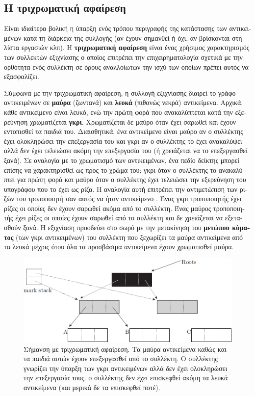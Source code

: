 \begin{greek}
\section{Η τριχρωματική αφαίρεση}
Είναι ιδιαίτερα βολική η ύπαρξη ενός τρόπου περιγραφής της
κατάστασης των αντικειμένων κατά τη διάρκεια της συλλογής
(αν έχουν σημανθεί ή όχι, αν βρίσκονται στη λίστα εργασιών
κλπ). Η \textbf{τριχρωματική αφαίρεση}  είναι ένας χρήσιμος χαρακτηρισμός
των συλλεκτών εξιχνίασης ο οποίος επιτρέπει την 
επιχειρηματολογία σχετικά με την ορθότητα ενός συλλέκτη
σε όρους αναλλοίωτων την ισχύ των οποίων πρέπει αυτός να
εξασφαλίζει. 

Σύμφωνα με την τριχρωματική αφαίρεση, η συλλογή εξιχνίασης
διαιρεί το γράφο αντικειμένων σε \textbf{μαύρα} (ζωντανά) 
και \textbf{λευκά} (πιθανώς νεκρά) αντικείμενα. Αρχικά, κάθε
αντικείμενο είναι λευκό, ενώ την πρώτη φορά που ανακαλύπτεται
κατά την εξερεύνηση χρωματίζεται \textbf{γκρι}. Χρωματίζεται
δε μαύρο όταν έχει σαρωθεί και έχουν εντοπισθεί τα παιδιά του.
Διαισθητικά, ένα αντικείμενο είναι μαύρο αν ο συλλέκτης έχει
ολοκληρώσει την επεξεργασία του και γκρι αν ο συλλέκτης το
έχει ανακαλύψει αλλά δεν έχει τελειώσει ακόμη την επεξεργασία
του (ή χρειάζεται να το επεξεργασθεί ξανά). Σε αναλογία με
το χρωματισμό των αντικειμένων, ένα πεδίο δείκτης μπορεί 
επίσης να χαρακτηρισθεί ως προς το χρώμα του: γκρι όταν ο
συλλέκτης το ανακαλύπτει για πρώτη φορά και μαύρο όταν ο
συλλέκτης έχει τελειώσει την εξερεύνηση του υπογράφου που
το έχει ως ρίζα.  Η αναλογία αυτή επιτρέπει την αντιμετώπιση
των ριζών του τροποποιητή σαν αυτός να ήταν αντικείμενο
\cite{DBLP:conf/iwmm/Pirinen98}. Ένας γκρι τροποποιητής έχει
ρίζες οι οποίες δεν έχουν σαρωθεί ακόμα από το συλλέκτη. 
Ένας μαύρος τροποποιητής έχει ρίζες οι οποίες έχουν σαρωθεί
από το συλλέκτη και δε χρειάζεται να εξετασθούν ξανά. Η
εξιχνίαση προοδεύει στο σωρό με την μετακίνηση του
\textbf{μετώπου κύματος} (των γκρι αντικειμένων)
του συλλέκτη που ξεχωρίζει τα μαύρα αντικείμενα από τα
λευκά μέχρις ότου όλα τα προσβάσιμα αντικείμενα έχουν
χρωματισθεί μαύρα.

\begin{figure}[H]
  \centering
  \includegraphics{figures/mrkswp_1}
  \caption[Σήμανση με τριχρωματική αφαίρεση]
    {Σήμανση με τριχρωματική αφαίρεση. Τα μαύρα αντικείμενα καθώς
     και τα παιδιά αυτών έχουν επεξεργασθεί από το συλλέκτη. Ο
     συλλέκτης γνωρίζει την ύπαρξη των γκρι αντικειμένων αλλά
     δεν έχει ολοκληρώσει την επεξεργασία τους. ο συλλέκτης δεν
     έχει επισκεφθεί ακόμη τα λευκά αντικείμενα (και μερικά δε
     τα επισκεφθεί ποτέ).}
  \label{fig:mrkswp_1}
\end{figure}


\end{greek}

